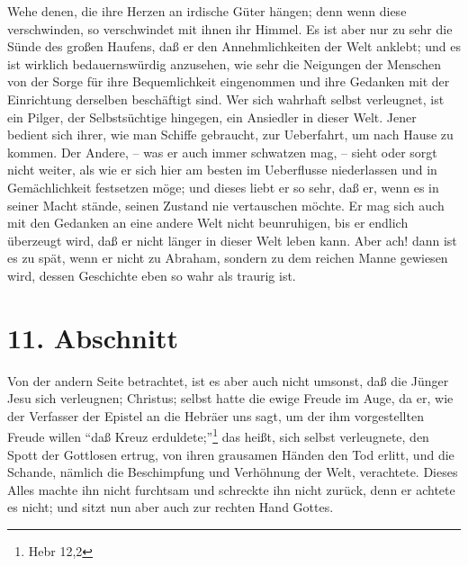 Wehe denen, die ihre Herzen an irdische Güter hängen; denn wenn diese
verschwinden, so verschwindet mit ihnen ihr Himmel. Es ist aber nur zu sehr die
Sünde des großen Haufens, daß er den Annehmlichkeiten der Welt anklebt; und es
ist wirklich bedauernswürdig anzusehen, wie sehr die Neigungen der Menschen von
der Sorge für ihre Bequemlichkeit eingenommen und ihre Gedanken mit der
Einrichtung derselben beschäftigt sind. Wer sich wahrhaft selbst verleugnet, ist
ein Pilger, der Selbstsüchtige hingegen, ein Ansiedler in dieser Welt. Jener
bedient sich ihrer, wie man Schiffe gebraucht, zur Ueberfahrt, um nach Hause zu
kommen. Der Andere, -- was er auch immer schwatzen mag, -- sieht oder sorgt
nicht weiter, als wie er sich hier am besten im Ueberflusse niederlassen und in
Gemächlichkeit festsetzen möge; und dieses liebt er so sehr, daß er, wenn es in
seiner Macht stände, seinen Zustand nie vertauschen möchte. Er mag sich auch mit
den Gedanken an eine andere Welt nicht beunruhigen, bis er endlich überzeugt
wird, daß er nicht länger in dieser Welt leben kann. Aber ach! dann ist es zu
spät, wenn er nicht zu Abraham, sondern zu dem reichen Manne gewiesen wird,
dessen Geschichte eben so wahr als traurig ist.

\section{11. Abschnitt}

Von der andern Seite betrachtet, ist es aber auch nicht umsonst, daß die Jünger
Jesu sich verleugnen; Christus; selbst hatte die ewige Freude im Auge, da er,
wie der Verfasser der Epistel an die Hebräer uns sagt, um der ihm vorgestellten
Freude willen "`daß Kreuz erduldete;"'\footnote{Hebr 12,2} das heißt, sich
selbst verleugnete, den Spott der Gottlosen ertrug, von ihren grausamen Händen
den Tod erlitt, und die Schande, nämlich die Beschimpfung und Verhöhnung der
Welt, verachtete. Dieses Alles machte ihn nicht furchtsam und schreckte ihn
nicht zurück, denn er achtete es nicht; und sitzt nun aber auch zur rechten Hand
Gottes.

